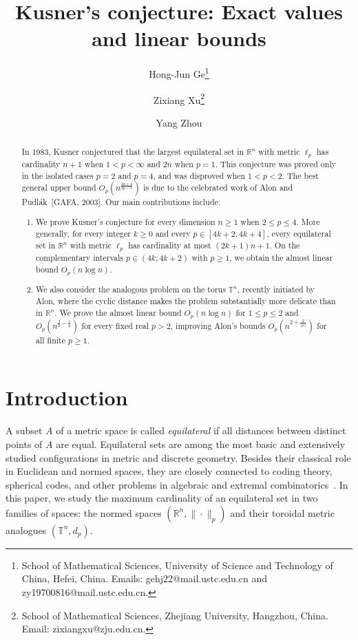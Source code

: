 \documentclass[11pt]{article}
\title{Kusner's conjecture: Exact values and linear bounds}
\author{
Hong-Jun Ge\thanks{School of Mathematical Sciences, University of Science and Technology of China,
Hefei, China. Emails: gehj22@mail.ustc.edu.cn and zy19700816@mail.ustc.edu.cn.}
\and 
Zixiang Xu\thanks{School of Mathematical Sciences, Zhejiang University, Hangzhou, China. Email: zixiangxu@zju.edu.cn. }
\and 
Yang Zhou\footnotemark[1]
}
\date{}
\theoremstyle{definition}
\begin{document}
\maketitle

\begin{abstract}
In 1983, Kusner conjectured that the 
largest equilateral set in \(\mathbb{R}^{n}\) with metric \(\ell_{p}\) has cardinality \(n+1\) when \(1<p<\infty\) and \(2n\) when \(p=1.\) This conjecture was proved only in the isolated cases $p=2$ and $p=4$, and was disproved when \(1<p<2\). The best general upper bound
\(O_p(n^{\frac{2p+2}{2p-1}})\) is due to the celebrated work of Alon and
Pudl\'ak~[GAFA, 2003]. Our main contributions include:
\begin{enumerate}
    \item[\textup{(1)}] We prove Kusner's conjecture for every dimension \(n\ge 1\) when $2\le p\le 4$. More generally, for every integer $k\ge 0$ and every $p\in[4k+2,4k+4]$, every equilateral set in $\mathbb{R}^{n}$ with metric $\ell_p$ has cardinality at most $(2k+1)n+1$. On the complementary intervals $p\in(4k,4k+2)$ with $p\geq 1$, we obtain the almost linear bound $O_p(n\log n)$.
    \item[\textup{(2)}] We also consider the analogous problem on the torus $\mathbb{T}^n$, recently initiated by Alon, where the cyclic distance makes the problem substantially more delicate than in \(\mathbb R^n\). We prove the almost linear bound $O_p(n\log n)$ for $1\le p\le 2$ and $O_p(n^{\frac{3}{2}-\frac{1}{p}})$ for every fixed real $p>2$, improving Alon's bounds $O_p(n^{2+\frac{2}{\lfloor p\rfloor}})$ for all finite $p\ge 1$.
\end{enumerate}
\end{abstract}


\section{Introduction}
A subset \(A\) of a metric space is called \emph{equilateral} if all distances
between distinct points of \(A\) are equal.
Equilateral sets are among the most basic and extensively studied configurations
in metric and discrete geometry.  Besides their classical role in Euclidean and
normed spaces, they are closely connected to coding theory, spherical codes, and
other problems in algebraic and extremal combinatorics~\cite{2018Inven,2016SIDMABukh,2021Annals,1973JoA,1966Vanlint}.  In this paper, we study
the maximum cardinality of an equilateral set in two families of spaces: the
normed spaces \((\mathbb R^n,\|\cdot \|_p)\) and their toroidal metric analogues
\((\mathbb T^n,d_p)\).
\end{document}
